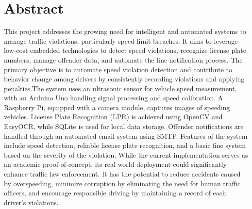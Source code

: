 \chapter*{Abstract}

This project addresses the growing need for intelligent and automated systems to manage traffic violations, particularly speed limit breaches. It aims to leverage low-cost embedded technologies to detect speed violations, recognize license plate numbers, manage offender data, and automate the fine notification process. The primary objective is to automate speed violation detection and contribute to behavior change among drivers by consistently recording violations and applying penalties.The system uses an ultrasonic sensor for vehicle speed measurement, with an Arduino Uno handling signal processing and speed calibration. A Raspberry Pi, equipped with a camera module, captures images of speeding vehicles. License Plate Recognition (LPR) is achieved using OpenCV and EasyOCR, while SQLite is used for local data storage. Offender notifications are handled through an automated email system using SMTP. Features of the system include speed detection, reliable license plate recognition, and a basic fine system based on the severity of the violation. While the current implementation serves as an academic proof-of-concept, its real-world deployment could significantly enhance traffic law enforcement. It has the potential to reduce accidents caused by overspeeding, minimize corruption by eliminating the need for human traffic officers, and encourage responsible driving by maintaining a record of each driver’s violations.